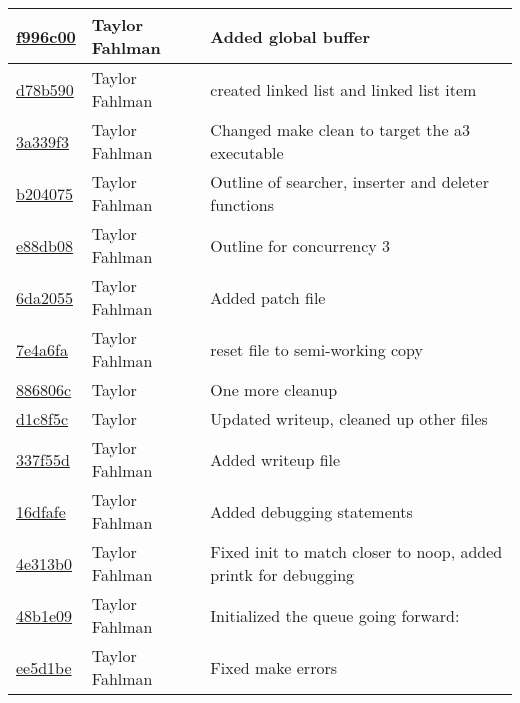 \begin{tabular}{l l l}
\href{https://github.com/fahlmant/cs444/commit/f996c006d61d3b31ba4570b25c11d30054dd0bd3}{f996c00} & Taylor Fahlman & Added global buffer\\\hline
\href{https://github.com/fahlmant/cs444/commit/d78b59016da477c48d733d257f3ff1f218cad153}{d78b590} & Taylor Fahlman & created linked list and linked list item\\\hline
\href{https://github.com/fahlmant/cs444/commit/3a339f3c25f472320ff955659e62ab5bef342bd1}{3a339f3} & Taylor Fahlman & Changed make clean to target the a3 executable\\\hline
\href{https://github.com/fahlmant/cs444/commit/b204075045d96c979c5f23c948a7aa96f7593ea5}{b204075} & Taylor Fahlman & Outline of searcher, inserter and deleter functions\\\hline
\href{https://github.com/fahlmant/cs444/commit/e88db0870f79e0fda434105d2b1a43ffe33248d0}{e88db08} & Taylor Fahlman & Outline for concurrency 3\\\hline
\href{https://github.com/fahlmant/cs444/commit/6da20559bf2fd5648a71e263be1fcddb68cb1786}{6da2055} & Taylor Fahlman & Added patch file\\\hline
\href{https://github.com/fahlmant/cs444/commit/7e4a6fad9eede1051a7ebc5db14bd3f360077816}{7e4a6fa} & Taylor Fahlman & reset file to semi-working copy\\\hline
\href{https://github.com/fahlmant/cs444/commit/886806cc8700041836984270d8457cb305283982}{886806c} & Taylor & One more cleanup\\\hline
\href{https://github.com/fahlmant/cs444/commit/d1c8f5c0597b0374c8fa150baf8654161f50eb83}{d1c8f5c} & Taylor & Updated writeup, cleaned up other files\\\hline
\href{https://github.com/fahlmant/cs444/commit/337f55d1a7a77b5840ab7cd55d3b98e6f8a4ea61}{337f55d} & Taylor Fahlman & Added writeup file\\\hline
\href{https://github.com/fahlmant/cs444/commit/16dfafe2b2ddaa55c00dc6f13d1624f5f348abdc}{16dfafe} & Taylor Fahlman & Added debugging statements\\\hline
\href{https://github.com/fahlmant/cs444/commit/4e313b07a7ce52c2eeb15e77780b0344fd58e776}{4e313b0} & Taylor Fahlman & Fixed init to match closer to noop, added printk for debugging\\\hline
\href{https://github.com/fahlmant/cs444/commit/48b1e091f6f8445fc355268ded9d2ab085f38217}{48b1e09} & Taylor Fahlman & Initialized the queue going forward:\\\hline
\href{https://github.com/fahlmant/cs444/commit/ee5d1be765a4359e795c1cfab79f45e7157dc427}{ee5d1be} & Taylor Fahlman & Fixed make errors\\\hline

\end{tabular}
